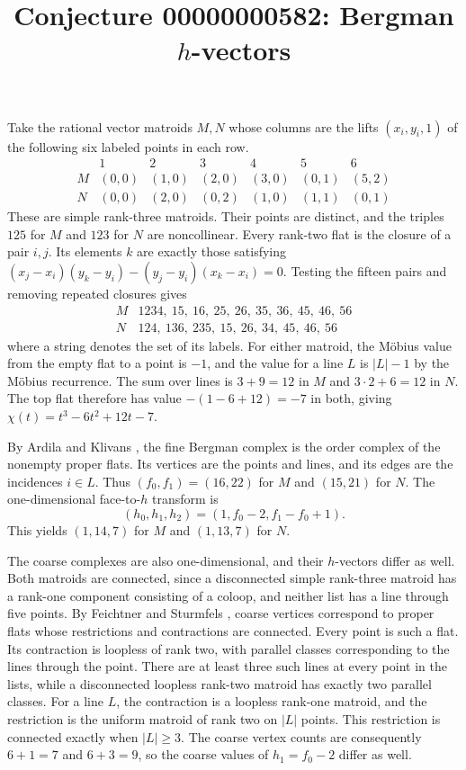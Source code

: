 \documentclass[10pt]{article}
\title{Conjecture 00000000582: Bergman \texorpdfstring{$h$}{h}-vectors}
\author{}
\date{}
\begin{document}
\maketitle

Take the rational vector matroids $M,N$ whose columns are the lifts
$(x_i,y_i,1)$ of the following six labeled points in each row.
\[
\begin{array}{c|rrrrrr}
 &1&2&3&4&5&6\\ \hline
 M&(0,0)&(1,0)&(2,0)&(3,0)&(0,1)&(5,2)\\
 N&(0,0)&(2,0)&(0,2)&(1,0)&(1,1)&(0,1)
\end{array}
\]
These are simple rank-three matroids. Their points are distinct,
and the triples $125$ for $M$ and $123$ for $N$ are noncollinear.
Every rank-two flat is the closure of a pair $i,j$. Its elements $k$
are exactly those satisfying
$(x_j-x_i)(y_k-y_i)-(y_j-y_i)(x_k-x_i)=0$.
Testing the fifteen pairs and removing repeated closures gives
\[
\begin{array}{c|l}
M &1234,\ 15,\ 16,\ 25,\ 26,\ 35,\ 36,\ 45,\ 46,\ 56\\
N &124,\ 136,\ 235,\ 15,\ 26,\ 34,\ 45,\ 46,\ 56
\end{array}
\]
where a string denotes the set of its labels. For either matroid,
the M\"obius value from the empty flat to a point is $-1$, and the
value for a line $L$ is $|L|-1$ by the M\"obius recurrence.
The sum over lines is $3+9=12$ in $M$ and $3\cdot2+6=12$ in $N$.
The top flat therefore has value $-(1-6+12)=-7$ in both, giving
$\chi(t)=t^3-6t^2+12t-7$.

By Ardila and Klivans \cite[Theorem~1]{ak}, the fine Bergman complex
is the order complex of the nonempty proper flats. Its vertices are
the points and lines, and its edges are the incidences $i\in L$.
Thus $(f_0,f_1)=(16,22)$ for $M$ and $(15,21)$ for $N$. The
one-dimensional face-to-$h$ transform is
\[
(h_0,h_1,h_2)=(1,f_0-2,f_1-f_0+1).
\]
This yields $(1,14,7)$ for $M$ and $(1,13,7)$ for $N$.

The coarse complexes are also one-dimensional, and their $h$-vectors
differ as well.
Both matroids are connected, since a disconnected simple rank-three
matroid has a rank-one component consisting of a coloop, and neither
list has a line through five points. By Feichtner and Sturmfels
\cite[Proposition~2.6 and Theorem~2.7]{fs}, coarse vertices correspond
to proper flats whose restrictions and contractions are connected.
Every point is such a flat. Its contraction is loopless of rank two,
with parallel classes corresponding to the lines through the point.
There are at least three such lines at every point in the lists, while
a disconnected loopless rank-two matroid has exactly two parallel
classes. For a line $L$, the contraction is a loopless rank-one
matroid, and the restriction is the uniform matroid of rank two on
$|L|$ points. This restriction is connected exactly when $|L|\ge3$.
The coarse vertex counts are consequently $6+1=7$ and $6+3=9$,
so the coarse values of $h_1=f_0-2$ differ as well.
\end{document}

